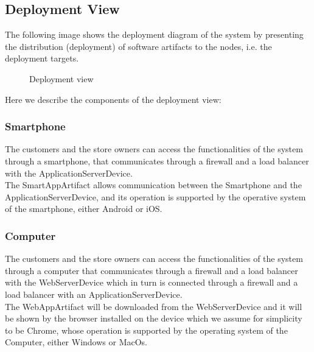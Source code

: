 \subsection{Deployment View}
The following image shows the deployment diagram of the system by presenting the distribution (deployment) of software artifacts to the nodes, i.e. the deployment targets.
\begin{figure}[H]
	\noindent
	\caption{Deployment view} 
\end{figure}
Here we describe the components of the deployment view:
\subsubsection{Smartphone}
The customers and the store owners can access the functionalities of the system through a smartphone, that communicates through a firewall and a load balancer with the ApplicationServerDevice.\\
The SmartAppArtifact allows communication between the Smartphone and the ApplicationServerDevice, and its operation is supported by the operative system of the smartphone, either Android or iOS.
\subsubsection{Computer}
The customers and the store owners can access the functionalities of the system through a computer that communicates through a firewall and a load balancer with the WebServerDevice which in turn is connected through a firewall and a load balancer with an ApplicationServerDevice.\\
The WebAppArtifact will be downloaded from the WebServerDevice and it will be shown by the browser installed on the device which we assume for simplicity to be Chrome, whose operation is supported by the operating system of the Computer, either Windows or MacOs. 
